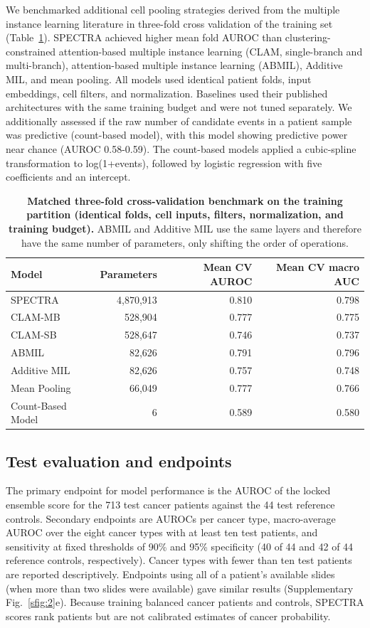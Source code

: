 \documentclass[11pt]{article}
\begin{document}
We benchmarked additional cell pooling strategies derived from the multiple instance learning literature in three-fold cross validation of the training set (Table~\ref{tab:2}). SPECTRA achieved higher mean fold AUROC than clustering-constrained attention-based multiple instance learning (CLAM\cite{lu2021}, single-branch and multi-branch), attention-based multiple instance learning (ABMIL)\cite{ilse2018}, Additive MIL\cite{javed2022}, and mean pooling. All models used identical patient folds, input embeddings, cell filters, and normalization. Baselines used their published architectures with the same training budget and were not tuned separately. We additionally assessed if the raw number of candidate events in a patient sample was predictive (count-based model), with this model showing predictive power near chance (AUROC 0.58-0.59). The count-based models applied a cubic-spline transformation to log(1+events), followed by logistic regression with five coefficients and an intercept.

\begin{table}[!tbp]
\centering
\caption{\textbf{Matched three-fold cross-validation benchmark on the training partition (identical folds, cell inputs, filters, normalization, and training budget).} ABMIL and Additive MIL use the same layers and therefore have the same number of parameters, only shifting the order of operations.}
\label{tab:2}
\begin{tabular}{lrrr}
\toprule
Model & Parameters & Mean CV AUROC & Mean CV macro AUC \\
\midrule
SPECTRA & 4,870,913 & 0.810 & 0.798 \\
CLAM-MB & 528,904 & 0.777 & 0.775 \\
CLAM-SB & 528,647 & 0.746 & 0.737 \\
ABMIL & 82,626 & 0.791 & 0.796 \\
Additive MIL & 82,626 & 0.757 & 0.748 \\
Mean Pooling & 66,049 & 0.777 & 0.766 \\
Count-Based Model & 6 & 0.589 & 0.580 \\
\bottomrule
\end{tabular}
\end{table}

\subsection*{Test evaluation and endpoints}

The primary endpoint for model performance is the AUROC of the locked ensemble score for the 713 test cancer patients against the 44 test reference controls. Secondary endpoints are AUROCs per cancer type, macro-average AUROC over the eight cancer types with at least ten test patients, and sensitivity at fixed thresholds of 90\% and 95\% specificity (40 of 44 and 42 of 44 reference controls, respectively). Cancer types with fewer than ten test patients are reported descriptively. Endpoints using all of a patient's available slides (when more than two slides were available) gave similar results (Supplementary Fig.~\ref{sfig:2}e). Because training balanced cancer patients and controls, SPECTRA scores rank patients but are not calibrated estimates of cancer probability.
\end{document}
